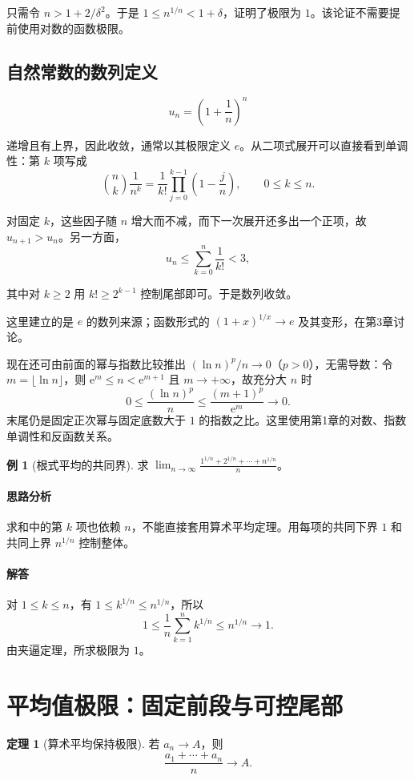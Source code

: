 \documentclass[UTF8,fontset=fandol,12pt,oneside,openany]{ctexrep}
\newcommand{\ee}{\mathrm e}
\theoremstyle{definition}
\newtheorem{theorem}{定理}[chapter]
\newtheorem{example}{例}[chapter]
\begin{document}
只需令 $n>1+2/\delta^2$。于是 $1\le n^{1/n}<1+\delta$，证明了极限为 $1$。该论证不需要提前使用对数的函数极限。

\subsection{自然常数的数列定义}
\[
u_n=\left(1+\frac1n\right)^n
\]

递增且有上界，因此收敛，通常以其极限定义 $e$。从二项式展开可以直接看到单调性：第 $k$ 项写成
\[
\binom nk\frac1{n^k}
=\frac1{k!}\prod_{j=0}^{k-1}\left(1-\frac jn\right),\qquad 0\le k\le n.
\]

对固定 $k$，这些因子随 $n$ 增大而不减，而下一次展开还多出一个正项，故 $u_{n+1}>u_n$。另一方面，
\[
u_n\le\sum_{k=0}^n\frac1{k!}<3,
\]

其中对 $k\ge2$ 用 $k!\ge2^{k-1}$ 控制尾部即可。于是数列收敛。

这里建立的是 $e$ 的数列来源；函数形式的 $(1+x)^{1/x}\to e$ 及其变形，在第3章讨论。

现在还可由前面的幂与指数比较推出 $(\ln n)^p/n\to0$（$p>0$），无需导数：令 $m=\lfloor\ln n\rfloor$，则 $\ee^m\le n<\ee^{m+1}$ 且 $m\to+\infty$，故充分大 $n$ 时
\[
0\le\frac{(\ln n)^p}{n}\le\frac{(m+1)^p}{\ee^m}\to0.
\]
末尾仍是固定正次幂与固定底数大于 $1$ 的指数之比。这里使用第1章的对数、指数单调性和反函数关系。

\begin{example}[根式平均的共同界]
求 $\displaystyle\lim_{n\to\infty}\frac{1^{1/n}+2^{1/n}+\cdots+n^{1/n}}n$。
\end{example}
\paragraph{思路分析} 求和中的第 $k$ 项也依赖 $n$，不能直接套用算术平均定理。用每项的共同下界 $1$ 和共同上界 $n^{1/n}$ 控制整体。
\paragraph{解答} 对 $1\le k\le n$，有 $1\le k^{1/n}\le n^{1/n}$，所以
\[
1\le\frac1n\sum_{k=1}^n k^{1/n}\le n^{1/n}\to1.
\]
由夹逼定理，所求极限为 $1$。

\section{平均值极限：固定前段与可控尾部}

\begin{theorem}[算术平均保持极限]
若 $a_n\to A$，则
\[
\frac{a_1+\cdots+a_n}{n}\to A.
\]
\end{theorem}
\end{document}
